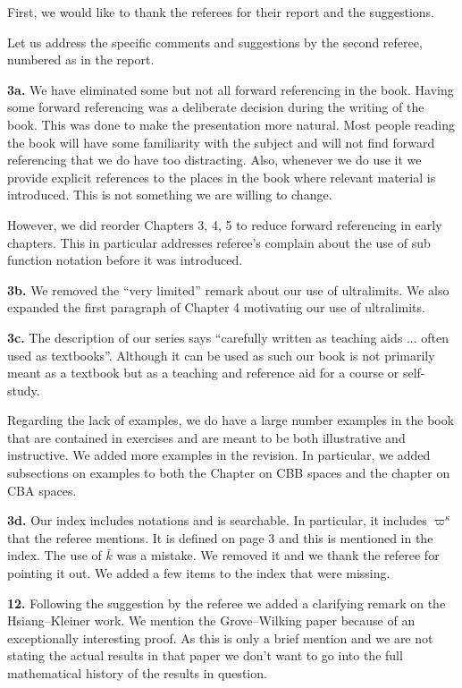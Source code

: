 \documentclass[11pt]{amsart}
\begin{document}
First, we would like to thank the referees for their report and the suggestions.

Let us address the specific comments and suggestions by the second referee, numbered as in the report.

\medskip

{\bf 3a.} 
We have eliminated some but not all forward referencing in the book.
Having some forward referencing was a deliberate decision during the writing of the book. This was done to make the presentation more natural. Most people reading the book will have some familiarity with the subject and will not find forward referencing that we do have
too distracting.
Also, whenever we do use it we provide explicit references to the places in the book where relevant material is introduced.
This is not something we are willing to change.

However, we did reorder Chapters 3, 4, 5 to reduce forward referencing in early chapters.
This in particular addresses referee's complain about the use of sub function notation before it was introduced.

\medskip

{\bf 3b.} 
We removed the ``very limited'' remark about our use of ultralimits. We also expanded the first paragraph of Chapter 4 motivating our use of ultralimits. 

\medskip

{\bf 3c.}
The description of our series says ``carefully written as teaching aids ... often used as textbooks''.  Although it can be used as such our book is not primarily meant as a textbook but as a teaching and reference aid for a course or self-study.

Regarding the lack of examples, we do have a large number examples in the book that are contained in exercises and are meant to be both illustrative and instructive.
We added  more examples in the revision.
In particular, we added subsections on examples to both the Chapter on CBB spaces and the chapter on CBA spaces.

\medskip

{\bf 3d. }
Our index includes notations and is searchable.
In particular, it includes $\varpi^\kappa$ that the referee mentions. It is defined on page 3 and this is mentioned in the index.
The use of $\bar k$ was a mistake.
We removed it and we thank the referee for pointing it out.
We added a few  items to the index that were missing. 

\medskip

{\bf 12.}
Following the suggestion by the referee we added a clarifying remark on the Hsiang--Kleiner work.
We mention the Grove--Wilking paper because of an exceptionally interesting proof. As this is only a brief mention and we are not stating the actual results in that paper we don't want to go into the full mathematical history of the results in question.
\end{document}
